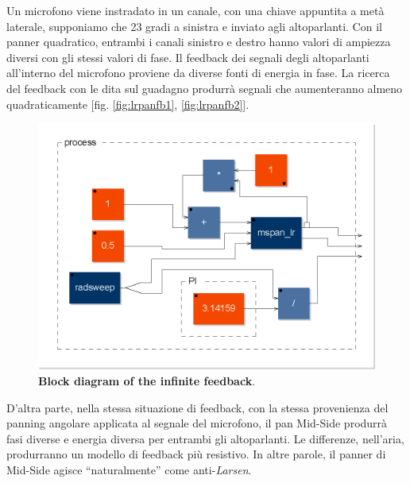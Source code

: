 Un microfono viene instradato in un canale, con una chiave appuntita a metà
laterale, supponiamo che 23 gradi a sinistra e inviato agli altoparlanti. Con il
panner quadratico, entrambi i canali sinistro e destro hanno valori di ampiezza
diversi con gli stessi valori di fase. Il feedback dei segnali degli
altoparlanti all'interno del microfono proviene da diverse fonti di energia in
fase. La ricerca del feedback con le dita sul guadagno produrrà segnali che
aumenteranno almeno quadraticamente [fig. \ref{fig:lrpanfb1}, \ref{fig:lrpanfb2}].

\begin{figure}[h]
\centering
\includegraphics[width=1\columnwidth]{CAPITOLI/1000/IMG/mspanlrfb_diagram}
\caption{\textbf{Block diagram of the infinite feedback}.}
\label{fig:mspanlrfbdiag}
\end{figure}

D'altra parte, nella stessa situazione di feedback, con la stessa provenienza
del panning angolare applicata al segnale del microfono, il pan Mid-Side
produrrà fasi diverse e energia diversa per entrambi gli altoparlanti. Le
differenze, nell'aria, produrranno un modello di feedback più resistivo. In
altre parole, il panner di Mid-Side agisce “naturalmente” come anti-\emph{Larsen}.


